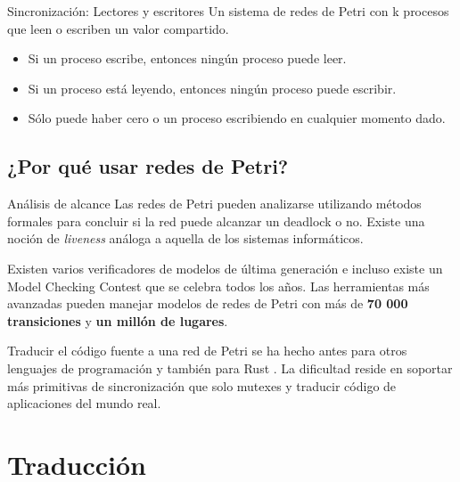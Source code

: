 \documentclass{beamer}
\begin{document}
\begin{frame}{Sincronización: Lectores y escritores}
  \scriptsize
  Un sistema de redes de Petri con k procesos que leen o escriben un valor compartido.

  \begin{itemize}
    \item Si un proceso escribe, entonces ningún proceso puede leer.
    \item Si un proceso está leyendo, entonces ningún proceso puede escribir.
    \item Sólo puede haber cero o un proceso escribiendo en cualquier momento dado.
  \end{itemize}

  \begin{figure}
    \centering
    
  \end{figure}
\end{frame}

\subsection{¿Por qué usar redes de Petri?}

\begin{frame}{Análisis de alcance}
  Las redes de Petri pueden analizarse utilizando métodos formales para concluir si la red puede alcanzar
  un deadlock o no. Existe una noción de \emph{liveness} análoga a aquella de los sistemas informáticos.
  
  \vfill
  \pause

  Existen varios verificadores de modelos de última generación e
  incluso existe un Model Checking Contest que se celebra todos los años.
  Las herramientas más avanzadas pueden manejar modelos de redes de Petri
  con más de \textbf{70 000 transiciones} y \textbf{un millón de lugares}.

  \vfill
  \pause

  Traducir el código fuente a una red de Petri se ha hecho antes para otros lenguajes de programación
  \cite{kavi2002modeling,moshtaghi2001} y también para Rust \cite{meyer2020, zhang2022deadlocks}.
  La dificultad reside en soportar más primitivas de sincronización
  que solo mutexes y traducir código de aplicaciones del mundo real.
\end{frame}

\section{Traducción}
\end{document}
